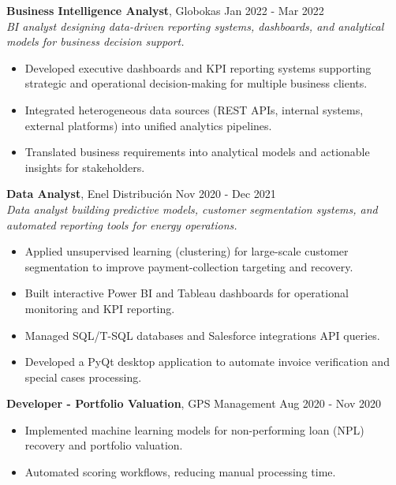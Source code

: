 \documentclass[10pt, letterpaper]{article}
\newenvironment{highlights}{
    \begin{itemize}[
        topsep=0.10 cm,
        parsep=0.10 cm,
        partopsep=0pt,
        itemsep=0pt,
        leftmargin=0 cm + 10pt
    ]
}{
    \end{itemize}
} %
\begin{document}
\vspace{0.2cm}
\noindent\textbf{Business Intelligence Analyst}, Globokas \hfill Jan 2022 - Mar 2022\\
\textit{BI analyst designing data-driven reporting systems, dashboards, and analytical models for business decision support.}
\begin{highlights}
    \item Developed executive dashboards and KPI reporting systems supporting strategic and operational decision-making for multiple business clients.
    \item Integrated heterogeneous data sources (REST APIs, internal systems, external platforms) into unified analytics pipelines.
    \item Translated business requirements into analytical models and actionable insights for stakeholders.
\end{highlights}

\vspace{0.2cm}
\noindent\textbf{Data Analyst}, Enel Distribución \hfill Nov 2020 - Dec 2021\\
\textit{Data analyst building predictive models, customer segmentation systems, and automated reporting tools for energy operations.}
\begin{highlights}
    \item Applied unsupervised learning (clustering) for large-scale customer segmentation to improve payment-collection targeting and recovery.
    \item Built interactive Power BI and Tableau dashboards for operational monitoring and KPI reporting.
    \item Managed SQL/T-SQL databases and Salesforce integrations API queries.
    \item Developed a PyQt desktop application to automate invoice verification and special cases processing.
\end{highlights}

\vspace{0.2cm}
\noindent\textbf{Developer - Portfolio Valuation}, GPS Management \hfill Aug 2020 - Nov 2020
\begin{highlights}
    \item Implemented machine learning models for non-performing loan (NPL) recovery and portfolio valuation.
    \item Automated scoring workflows, reducing manual processing time.
\end{highlights}
\end{document}

